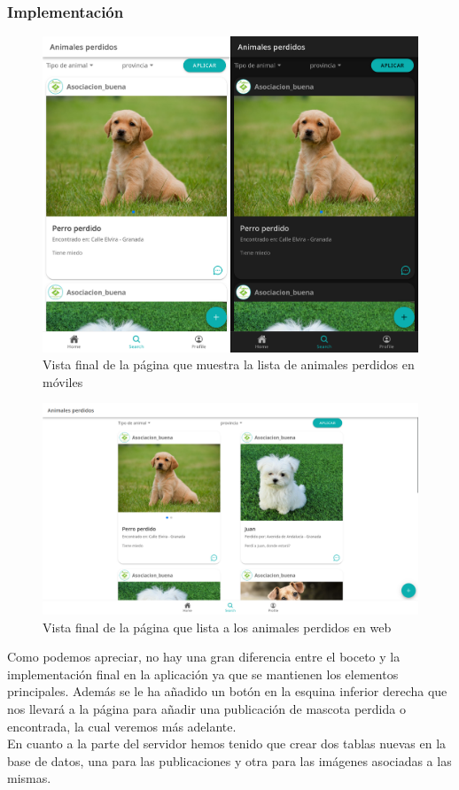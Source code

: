 \subsubsection{Implementación}
\begin{figure}[H]
	\centering
	\includegraphics[width=0.5\linewidth]{"sprint 2/hu3/disenoFinal"}
	\caption{Vista final de la página que muestra la lista de animales perdidos en móviles}
	\label{fig:listaAdop}
\end{figure}

\begin{figure}[H]
	\centering
	\includegraphics[width=0.8\linewidth]{"sprint 2/hu3/disenoFinalWeb"}
	\caption{Vista final de la página que lista a los animales perdidos en web}
	\label{fig:disenofinalweb}
\end{figure}

Como podemos apreciar, no hay una gran diferencia entre el boceto y la implementación final en la aplicación ya que se mantienen los elementos principales. Además se le ha añadido un botón en la esquina inferior derecha que nos llevará a la página  para añadir una publicación de mascota perdida o encontrada, la cual veremos más adelante.\\

En cuanto a la parte del servidor hemos tenido que crear dos tablas nuevas en la base de datos, una para las publicaciones y otra para las imágenes asociadas a las mismas.\\

